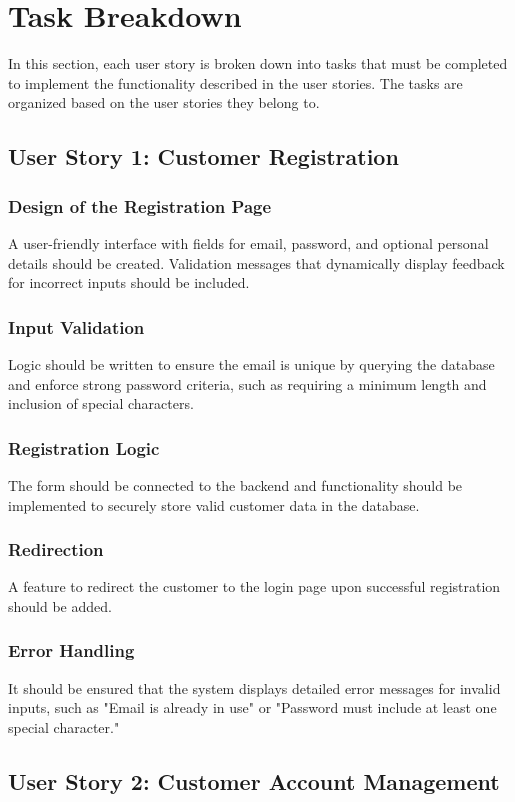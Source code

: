 \documentclass[a4paper,journal]{IEEEtran}
\begin{document}
\section{Task Breakdown}
In this section, each user story is broken down into tasks that must be
completed to implement the functionality described in the user stories.
The tasks are organized based on the user stories they belong to.

\subsection{User Story 1: Customer Registration}
\subsubsection{Design of the Registration Page}
A user-friendly interface with fields for email, password, and optional personal
details should be created.
Validation messages that dynamically display feedback for incorrect inputs
should be included.
\subsubsection{Input Validation}
Logic should be written to ensure the email is unique by querying the database
and enforce strong password criteria, such as requiring a minimum length and
inclusion of special characters.
\subsubsection{Registration Logic}
The form should be connected to the backend and functionality should be
implemented to securely store valid customer data in the database.
\subsubsection{Redirection}
A feature to redirect the customer to the login page upon successful
registration should be added.
\subsubsection{Error Handling}
It should be ensured that the system displays detailed error messages for
invalid inputs, such as
"Email is already in use" or
"Password must include at least one special character."

\subsection{User Story 2: Customer Account Management}
\end{document}
